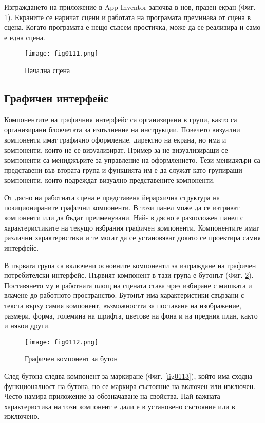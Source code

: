Изграждането на приложение в App Inventor започва в нов, празен екран (Фиг. \ref{fig0111}). Екраните се наричат сцени и работата на програмата преминава от сцена в сцена. Когато програмата е нещо съвсем простичка, може да се реализира и само е една сцена. 

\begin{figure}[H]
  \centering
  \texttt{[image: fig0111.png]}
  \caption{Начална сцена}
\label{fig0111}
\end{figure}

\subsection{Графичен интерфейс}

Компонентите на графичния интерфейс са организирани в групи, както са организирани блокчетата за изпълнение на инструкции. Повечето визуални компоненти имат графично оформление, директно на екрана, но има и компоненти, които не се визуализират. Пример за не визуализиращи се компоненти са мениджърите за управление на оформлението. Тези мениджъри са представени във втората група и функцията им е да служат като групиращи компоненти, които подреждат визуално представените компоненти. 

От дясно на работната сцена е представена йерархична структура на позиционираните графични компоненти. В този панел може да се изтриват компоненти или да бъдат преименувани. Най- в дясно е разположен панел с характеристиките на текущо избрания графичен компоненти. Компонентите имат различни характеристики и те могат да се установяват докато се проектира самия интерфейс. 

В първата група са включени основните компоненти за изграждане на графичен потребителски интерфейс. Първият компонент в тази група е бутонът (Фиг. \ref{fig0112}). Поставянето му в работната площ на сцената става чрез избиране с мишката и влачене до работното пространство. Бутонът има характеристики свързани с текста върху самия компонент, възможността за поставяне на изображение, размери, форма, големина на шрифта, цветове на фона и на предния план, както и някои други.

\begin{figure}[H]
  \centering
  \texttt{[image: fig0112.png]}
  \caption{Графичен компонент за бутон}
\label{fig0112}
\end{figure}

След бутона следва компонент за маркиране (Фиг. \ref{fig0113}), който има сходна функционалност на бутона, но се маркира състояние на включен или изключен. Често намира приложение за обозначаване на свойства. Най-важната характеристика на този компонент е дали е в установено състояние или в изключено. 

